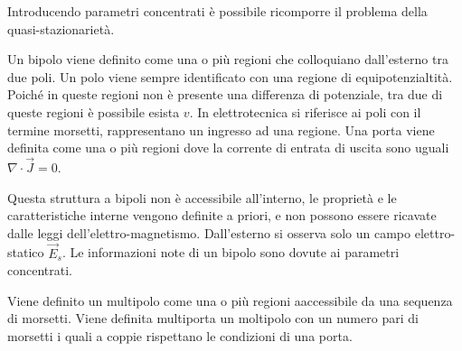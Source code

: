 \documentclass{article}
\numberwithin{equation}{subsection}
\begin{document}
Introducendo parametri concentrati è possibile ricomporre il problema della quasi-stazionarietà. 

Un bipolo viene definito come una o più regioni che colloquiano dall'esterno tra due poli. Un polo viene sempre identificato con una regione di equipotenzialtità. Poiché in 
queste regioni non è presente una differenza di potenziale, tra due di queste regioni è possibile esista $v$. In elettrotecnica si riferisce ai poli con il termine morsetti, 
rappresentano un ingresso ad una regione. Una porta viene definita come una o più regioni dove la corrente di entrata di uscita sono uguali $\nabla\cdot\vec{J}=0$.

\begin{center}
\end{center}
Questa struttura a bipoli non è accessibile all'interno, le proprietà e le caratteristiche interne vengono definite a priori, e non possono essere ricavate dalle leggi 
dell'elettro-magnetismo. Dall'esterno si osserva solo un campo elettro-statico $\vec{E}_s$. Le informazioni note di un bipolo sono dovute ai parametri concentrati. 

Viene definito un multipolo come una o più regioni aaccessibile da una sequenza di morsetti. Viene definita multiporta un moltipolo con un numero pari di morsetti i quali 
a coppie rispettano le condizioni di una porta. 

\begin{center}
\end{center}
\end{document}
